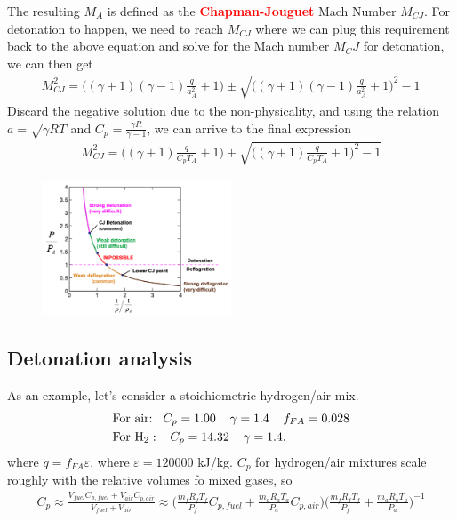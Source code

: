 \documentclass[a4paper,10pt]{article}
\begin{document}
The resulting $M_A$ is defined as the \textcolor{red}{\textbf{Chapman-Jouguet}} Mach Number $M_{CJ}$. For detonation to happen, we need to reach $M_{CJ}$ where we can plug this requirement back to the above equation and solve for the Mach number $M_CJ$ for detonation, we can then get
\begin{gather*}
    M_{CJ}^2 = \Bigg((\gamma+1)(\gamma-1)\frac{q}{a_A^2}+1\Bigg)\pm\sqrt{\Bigg((\gamma+1)(\gamma-1)\frac{q}{a_A^2}+1\Bigg)^2-1}
\end{gather*}
Discard the negative solution due to the non-physicality, and using the relation $a = \sqrt{\gamma RT}$ and $C_p = \frac{\gamma R}{\gamma-1}$, we can arrive to the final expression
\begin{gather*}
    \boxed{M_{CJ}^2 =\Bigg((\gamma+1)\frac{q}{C_pT_A}+1\Bigg)+\sqrt{\Bigg((\gamma+1)\frac{q}{C_pT_A}+1\Bigg)^2-1}}
\end{gather*}
\vspace*{-0.3cm}
\begin{figure}[H]
    \centering
    \includegraphics[width=0.5\textwidth]{Figure/MCJ.png}
\end{figure}

\subsection{Detonation analysis}
As an example, let's consider a stoichiometric hydrogen/air mix. 
\begin{gather*}
    \begin{split}
        &\text{For air:}\hspace*{0.3cm}C_p = 1.00\hspace*{0.4cm}\gamma = 1.4\hspace*{0.4cm}f_{FA} = 0.028\\
        &\text{For H}_2:\hspace*{0.3cm}C_p = 14.32\hspace*{0.4cm}\gamma = 1.4.
    \end{split}
\end{gather*}
where $q = f_{FA}\varepsilon$, where $\varepsilon = 120000$ kJ/kg. $C_p$ for hydrogen/air mixtures scale roughly with the relative volumes fo mixed gases, so 
\vspace*{-0.09cm}
\begin{gather*}
    C_p\approx\frac{V_{fuel}C_{p,fuel}+V_{air}C_{p,air}}{V_{fuel}+V_{air}}\approx\Bigg(\frac{m_fR_fT_f}{P_f}C_{p,fuel}+\frac{m_aR_aT_a}{P_a}C_{p,air}\Bigg)\Bigg(\frac{m_fR_fT_f}{P_f}+\frac{m_aR_aT_a}{P_a}\Bigg)^{-1}
\end{gather*}
\end{document}
